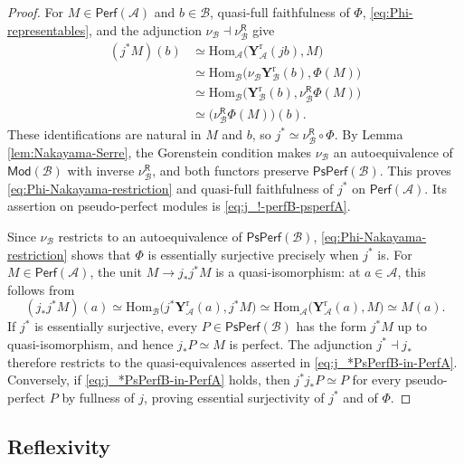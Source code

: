 \documentclass[11pt,letterpaper,reqno]{amsart}
\theoremstyle{plain}
\theoremstyle{definition}
\theoremstyle{plain}
\theoremstyle{definition}
\numberwithin{equation}{section}
\begin{document}
\begin{proof}
For $M\in\mathsf{Perf}(\mathscr A)$ and $b\in\mathscr B$, quasi-full faithfulness of $\Phi$, \eqref{eq:Phi-representables}, and the adjunction $\nu_{\mathscr B}\dashv\nu_{\mathscr B}^{\mathsf R}$ give
\begin{align*}
(j^*M)(b)
&\simeq\mathrm{Hom}_{\mathscr A}\bigl(\mathbf Y_{\mathscr A}^{\mathrm r}(jb),M\bigr)\\
&\simeq\mathrm{Hom}_{\mathscr B}\bigl(\nu_{\mathscr B}\mathbf Y_{\mathscr B}^{\mathrm r}(b),\Phi(M)\bigr)\\
&\simeq\mathrm{Hom}_{\mathscr B}\bigl(\mathbf Y_{\mathscr B}^{\mathrm r}(b),\nu_{\mathscr B}^{\mathsf R}\Phi(M)\bigr)\\
&\simeq\bigl(\nu_{\mathscr B}^{\mathsf R}\Phi(M)\bigr)(b).
\end{align*}
These identifications are natural in $M$ and $b$, so $j^*\simeq\nu_{\mathscr B}^{\mathsf R}\circ\Phi$.
By Lemma \ref{lem:Nakayama-Serre}, the Gorenstein condition makes $\nu_{\mathscr B}$ an autoequivalence of $\mathsf{Mod}(\mathscr B)$ with inverse $\nu_{\mathscr B}^{\mathsf R}$, and both functors preserve $\mathsf{PsPerf}(\mathscr B)$.
This proves \eqref{eq:Phi-Nakayama-restriction} and quasi-full faithfulness of $j^*$ on $\mathsf{Perf}(\mathscr A)$.
Its assertion on pseudo-perfect modules is \eqref{eq:j_!-perfB-psperfA}.

Since $\nu_{\mathscr B}$ restricts to an autoequivalence of $\mathsf{PsPerf}(\mathscr B)$, \eqref{eq:Phi-Nakayama-restriction} shows that $\Phi$ is essentially surjective precisely when $j^*$ is.
For $M\in\mathsf{Perf}(\mathscr A)$, the unit $M\to j_*j^*M$ is a quasi-isomorphism: at $a\in\mathscr A$, this follows from
\[
(j_*j^*M)(a)
\simeq\mathrm{Hom}_{\mathscr B}\bigl(j^*\mathbf Y_{\mathscr A}^{\mathrm r}(a),j^*M\bigr)
\simeq\mathrm{Hom}_{\mathscr A}\bigl(\mathbf Y_{\mathscr A}^{\mathrm r}(a),M\bigr)
\simeq M(a).
\]
If $j^*$ is essentially surjective, every $P\in\mathsf{PsPerf}(\mathscr B)$ has the form $j^*M$ up to quasi-isomorphism, and hence $j_*P\simeq M$ is perfect.
The adjunction $j^*\dashv j_*$ therefore restricts to the quasi-equivalences asserted in \eqref{eq:j_*PsPerfB-in-PerfA}.
Conversely, if \eqref{eq:j_*PsPerfB-in-PerfA} holds, then $j^*j_*P\simeq P$ for every pseudo-perfect $P$ by fullness of $j$, proving essential surjectivity of $j^*$ and of $\Phi$.
\end{proof}






\subsection{Reflexivity}
\end{document}
